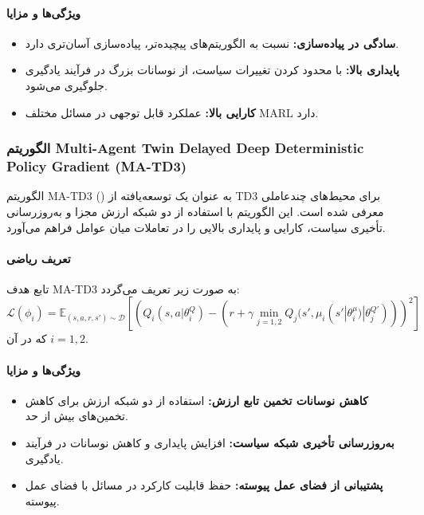 \paragraph{ویژگی‌ها و مزایا}
\begin{itemize}
	\item \textbf{سادگی در پیاده‌سازی:} نسبت به الگوریتم‌های پیچیده‌تر، پیاده‌سازی آسان‌تری دارد.
	\item \textbf{پایداری بالا:} با محدود کردن تغییرات سیاست، از نوسانات بزرگ در فرآیند یادگیری جلوگیری می‌شود.
	\item \textbf{کارایی بالا:} عملکرد قابل توجهی در مسائل مختلف MARL دارد.
\end{itemize}

\subsubsection{الگوریتم Multi-Agent Twin Delayed Deep Deterministic Policy Gradient (MA-TD3)}

الگوریتم MA-TD3 () به عنوان یک توسعه‌یافته از TD3 برای محیط‌های چندعاملی معرفی شده است. این الگوریتم با استفاده از دو شبکه ارزش مجزا و به‌روزرسانی تأخیری سیاست، کارایی و پایداری بالایی را در تعاملات میان عوامل فراهم می‌آورد.

\paragraph{تعریف ریاضی}
تابع هدف MA-TD3 به صورت زیر تعریف می‌گردد:
\[
\mathcal{L}(\phi_i) = \mathbb{E}_{(s,a,r,s') \sim \mathcal{D}} \left[ \left( Q_i(s,a|\theta_i^Q) - \left( r + \gamma \min_{j=1,2} Q_j(s', \mu_i(s'|\theta_i^\mu)|\theta_j^{Q'}) \right) \right)^2 \right]
\]
که در آن \( i = 1, 2 \).

\paragraph{ویژگی‌ها و مزایا}
\begin{itemize}
	\item \textbf{کاهش نوسانات تخمین تابع ارزش:} استفاده از دو شبکه ارزش برای کاهش تخمین‌های بیش از حد.
	\item \textbf{به‌روزرسانی تأخیری شبکه سیاست:} افزایش پایداری و کاهش نوسانات در فرآیند یادگیری.
	\item \textbf{پشتیبانی از فضای عمل پیوسته:} حفظ قابلیت کارکرد در مسائل با فضای عمل پیوسته.
\end{itemize}

